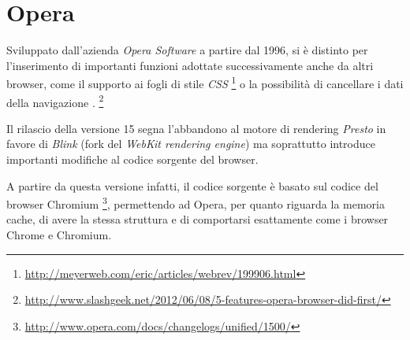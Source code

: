 \begin{savenotes}
	\begin{table}[H]
		\begin{center}
			\end{center}
			\caption{Firefox: struttura di un record in un \textit{entry file}}
	\end{table}
\end{savenotes}

\clearpage

\section{Opera}

Sviluppato dall'azienda \textit{Opera Software} a partire dal 1996, si è distinto per l'inserimento di importanti funzioni adottate successivamente anche da altri browser, come il supporto ai fogli di stile \textit{CSS} \footnote{\url{http://meyerweb.com/eric/articles/webrev/199906.html}} o la possibilità di cancellare i dati della navigazione . \footnote{\url{http://www.slashgeek.net/2012/06/08/5-features-opera-browser-did-first/}}

Il rilascio della versione 15 segna l'abbandono al motore di rendering \textit{Presto} in favore di \textit{Blink} (fork del \textit{WebKit rendering engine}) ma soprattutto introduce importanti modifiche al codice sorgente del browser. 

A partire da questa versione infatti, il codice sorgente è basato sul codice del browser Chromium \footnote{\url{http://www.opera.com/docs/changelogs/unified/1500/}}, permettendo ad Opera, per quanto riguarda la memoria cache, di avere la stessa struttura e di comportarsi esattamente come i browser Chrome e Chromium.

